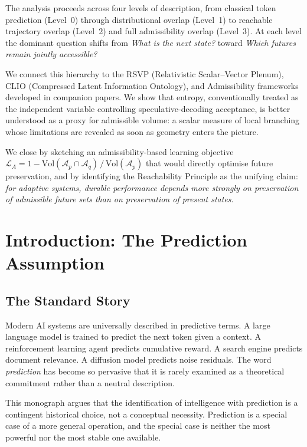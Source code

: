 \documentclass[11pt, a4paper, openany]{book}
\theoremstyle{plain}
\theoremstyle{definition}
\theoremstyle{remark}
\newcommand{\Ap}{\mathcal{A}_p}
\newcommand{\Aq}{\mathcal{A}_q}
\newcommand{\Vol}{\mathrm{Vol}}
\begin{document}
The analysis proceeds across four levels of description, from classical token
prediction (Level~0) through distributional overlap (Level~1) to reachable
trajectory overlap (Level~2) and full admissibility overlap (Level~3).
At each level the dominant question shifts from \emph{What is the next state?}
toward \emph{Which futures remain jointly accessible?}

We connect this hierarchy to the RSVP (Relativistic Scalar--Vector Plenum),
CLIO (Compressed Latent Information Ontology), and Admissibility frameworks
developed in companion papers.
We show that entropy, conventionally treated as the independent variable
controlling speculative-decoding acceptance, is better understood as a proxy
for admissible volume: a scalar measure of local branching whose limitations
are revealed as soon as geometry enters the picture.

We close by sketching an admissibility-based learning objective
$\mathcal{L}_A = 1 - \Vol(\Ap \cap \Aq)\,/\,\Vol(\Ap)$
that would directly optimise future preservation, and by identifying
the Reachability Principle as the unifying claim:
\emph{for adaptive systems, durable performance depends more strongly on
preservation of admissible future sets than on preservation of present states}.

\tableofcontents

\mainmatter

\chapter{Introduction: The Prediction Assumption}
\label{ch:introduction}

\section{The Standard Story}

Modern AI systems are universally described in predictive terms.
A large language model is trained to predict the next token given a context.
A reinforcement learning agent predicts cumulative reward.
A search engine predicts document relevance.
A diffusion model predicts noise residuals.
The word \emph{prediction} has become so pervasive that it is rarely examined
as a theoretical commitment rather than a neutral description.

This monograph argues that the identification of intelligence with prediction
is a contingent historical choice, not a conceptual necessity.
Prediction is a special case of a more general operation, and the special case
is neither the most powerful nor the most stable one available.
\end{document}
